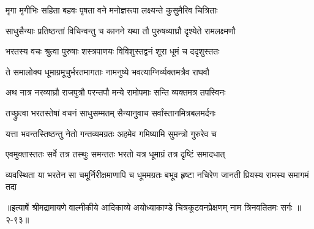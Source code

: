 \twolineshloka
{मृगा मृगीभिः सहिता बहवः पृषता वने}
{मनोज्ञरूपा लक्ष्यन्ते कुसुमैरिव चित्रिताः} %

\twolineshloka
{साधुसैन्याः प्रतिष्ठन्तां विचिन्वन्तु च कानने}
{यथा तौ पुरुषव्याघ्रौ दृश्येते रामलक्ष्मणौ} %

\twolineshloka
{भरतस्य वचः श्रुत्वा पुरुषाः शस्त्रपाणयः}
{विविशुस्तद्वनं शूरा धूमं च ददृशुस्ततः} %

\twolineshloka
{ते समालोक्य धूमाग्रमूचुर्भरतमागताः}
{नामनुष्ये भवत्याग्निर्व्यक्तमत्रैव राघवौ} %

\twolineshloka
{अथ नात्र नरव्याघ्रौ राजपुत्रौ परन्तपौ}
{मन्ये रामोपमाः सन्ति व्यक्तमत्र तपस्विनः} %

\twolineshloka
{तच्छ्रुत्वा भरतस्तेषां वचनं साधुसम्मतम्}
{सैन्यानुवाच सर्वांस्तानमित्रबलमर्दनः} %

\twolineshloka
{यत्ता भवन्तस्तिष्ठन्तु नेतो गन्तव्यमग्रतः}
{अहमेव गमिष्यामि सुमन्त्रो गुरुरेव च} %

\twolineshloka
{एवमुक्तास्ततः सर्वे तत्र तस्थुः समन्ततः}
{भरतो यत्र धूमाग्रं तत्र दृष्टिं समादधात्} %

\twolineshloka
{व्यवस्थिता या भरतेन सा चमूर्निरीक्षमाणापि च धूममग्रतः}
{बभूव हृष्टा नचिरेण जानती प्रियस्य रामस्य समागमं तदा} %


॥इत्यार्षे श्रीमद्रामायणे वाल्मीकीये आदिकाव्ये अयोध्याकाण्डे चित्रकूटवनप्रेक्षणम् नाम त्रिनवतितमः सर्गः ॥२-९३॥
